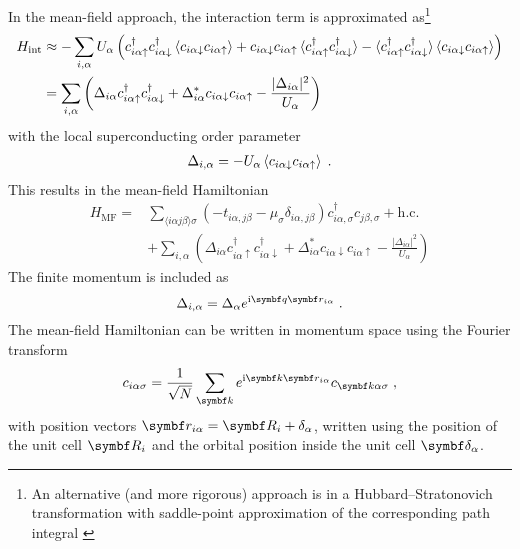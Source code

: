 \documentclass[../main.tex]{subfiles}
\begin{document}
In the mean-field approach, the interaction term is approximated as\footnote{An alternative (and more rigorous) approach is in a Hubbard–Stratonovich transformation with saddle-point approximation of the corresponding path integral \cite{colemanIntroductionManyBodyPhysics2015}}
\begin{align}
	H_{\mathrm{int}} &\approx -\sum_{i, \alpha} U_{\alpha} \left(
	c_{i \alpha \uparrow}^{\dagger} c_{i \alpha \downarrow}^{\dagger} \braket{c_{i \alpha \downarrow} c_{i \alpha \uparrow}}
	+ c_{i \alpha \downarrow} c_{i \alpha \uparrow} \braket{c_{i \alpha \uparrow}^{\dagger} c_{i \alpha \downarrow}^{\dagger}} - \braket{c_{i \alpha \uparrow}^{\dagger} c_{i \alpha \downarrow}^{\dagger}} \braket{c_{i \alpha \downarrow} c_{i \alpha \uparrow}} \right) \\
	&= \sum_{i, \alpha} \left(\Delta_{i \alpha} c_{i \alpha \uparrow}^{\dagger} c_{i \alpha \downarrow}^{\dagger} + \Delta_{i \alpha}^{*} c_{i \alpha \downarrow} c_{i \alpha \uparrow} - \frac{\vert \Delta_{i \alpha} \vert^2}{U_{\alpha}}\right)
\end{align}
with the local superconducting order parameter
\begin{align}
	\Delta_{i, \alpha} = -U_{\alpha} \braket{c_{i \alpha \downarrow} c_{i \alpha \uparrow}} \;.
\end{align}
This results in the mean-field Hamiltonian
\begin{align}
	H_{\mathrm{MF}} = &\sum_{\langle i \alpha j \beta \rangle \sigma} \left(-t_{i \alpha, j \beta} - \mu_{\sigma} \delta_{i \alpha, j \beta}\right) c_{i \alpha, \sigma}^{\dagger} c_{j \beta, \sigma} + \mathrm{h.c.} \nonumber \\
	&+ \sum_{i, \alpha} \left(\Delta_{i \alpha} c_{i \alpha \uparrow}^{\dagger} c_{i \alpha \downarrow}^{\dagger} + \Delta_{i \alpha}^{*} c_{i \alpha \downarrow} c_{i \alpha \uparrow} - \frac{\vert \Delta_{i \alpha} \vert^2}{U_{\alpha}}\right)
\end{align}
The finite momentum is included as
\begin{equation}
	\Delta_{i, \alpha} = \Delta_{\alpha} e^{\iu \vb{q} \vb{r}_{i \alpha}} \;.
\end{equation}
The mean-field Hamiltonian can be written in momentum space using the Fourier transform
\begin{equation}
	c_{i \alpha \sigma} = \frac{1}{\sqrt{N}} \sum_{\vb{k}} e^{\iu \vb{k} \vb{r}_{i \alpha}} c_{\vb{k} \alpha \sigma} \;,
\end{equation}
with position vectors \(\vb{r}_{i \alpha} = \vb{R}_i + \delta_{\alpha}\), written using the position of the unit cell \(\vb{R}_i\) and the orbital position inside the unit cell \(\vb{\delta}_{\alpha}\).
\end{document}
